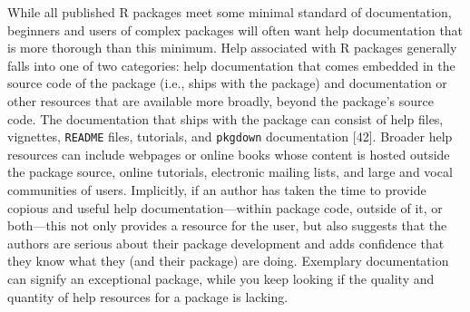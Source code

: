 \documentclass[10pt,letterpaper]{article}
\begin{document}
While all published R packages meet some minimal standard of
documentation, beginners and users of complex packages will often want
help documentation that is more thorough than this minimum. Help
associated with R packages generally falls into one of two categories:
help documentation that comes embedded in the source code of the package
(i.e., ships with the package) and documentation or other resources that
are available more broadly, beyond the package's source code. The
documentation that ships with the package can consist of help files,
vignettes, \texttt{README} files, tutorials, and \texttt{pkgdown}
documentation {[}42{]}. Broader help resources can include webpages or
online books whose content is hosted outside the package source, online
tutorials, electronic mailing lists, and large and vocal communities of
users. Implicitly, if an author has taken the time to provide copious
and useful help documentation---within package code, outside of it, or
both---this not only provides a resource for the user, but also suggests
that the authors are serious about their package development and adds
confidence that they know what they (and their package) are doing.
Exemplary documentation can signify an exceptional package, while you
keep looking if the quality and quantity of help resources for a package
is lacking.
\end{document}
